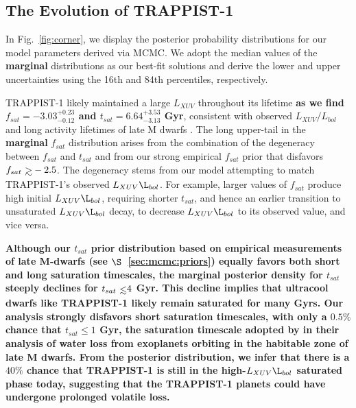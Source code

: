 \documentclass[twocolumn]{aastex62}
\def\gsim{~\rlap{$>$}{\lower 1.0ex\hbox{$\sim$}}}
\def\lsim{~\rlap{$<$}{\lower 1.0ex\hbox{$\sim$}}}
\newcommand{\xxx}[1]{{\textbf{#1}}}
\begin{document}
\subsection{The Evolution of TRAPPIST-1}

In Fig.~\ref{fig:corner}, we display the posterior probability distributions for our model parameters derived via MCMC. We adopt the median values of the \xxx{marginal} distributions as our best-fit solutions and derive the lower and upper uncertainties using the 16th and 84th percentiles, respectively. 

TRAPPIST-1 likely maintained a large $L_{XUV}$ throughout its lifetime \xxx{as we find $f_{sat} = -3.03^{+0.23}_{-0.12}$ and $t_{sat} = 6.64^{+3.53}_{-3.13}$ Gyr}, consistent with observed $L_{XUV}/L_{bol}$ and long activity lifetimes of late M dwarfs \citep{West2008,Wright2018}. The long upper-tail in the \xxx{marginal} $f_{sat}$ distribution arises from the combination of the degeneracy between $f_{sat}$ and $t_{sat}$ and from our strong empirical $f_{sat}$ prior that disfavors $f_{sat} \gsim -2.5$. The degeneracy stems from our model attempting to match TRAPPIST-1's observed \xxx{$L_{XUV}\L_{bol}$}. For example, larger values of $f_{sat}$ produce high initial \xxx{$L_{XUV}\L_{bol}$}, requiring shorter $t_{sat}$, and hence an earlier transition to unsaturated \xxx{$L_{XUV}\L_{bol}$} decay, to decrease \xxx{$L_{XUV}\L_{bol}$} to its observed value, and vice versa. 

\xxx{Although our $t_{sat}$ prior distribution based on empirical measurements of late M-dwarfs (see $\S$~\ref{sec:mcmc:priors}) equally favors both short and long saturation timescales, the marginal posterior density for $t_{sat}$ steeply declines for $t_{sat} \lsim 4$ Gyr. This decline implies that ultracool dwarfs like TRAPPIST-1 likely remain saturated for many Gyrs. Our analysis strongly disfavors short saturation timescales, with only a $0.5\%$ chance that $t_{sat} \leq 1$ Gyr, the saturation timescale adopted by \citet{Luger2015} in their analysis of water loss from exoplanets orbiting in the habitable zone of late M dwarfs. From the posterior distribution, we infer that there is a $40\%$ chance that TRAPPIST-1 is still in the high-$L_{XUV}\L_{bol}$ saturated phase today, suggesting that the TRAPPIST-1 planets could have undergone prolonged volatile loss.}
\end{document}
